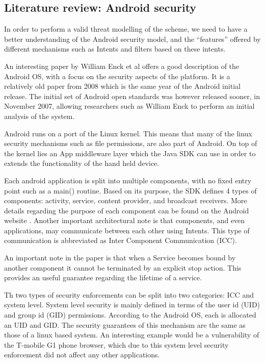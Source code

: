 \subsection{Literature review: Android security}
In order to perform a valid threat modelling of the scheme, we need to have a better understanding of the Android security model, and the ``features'' offered by different mechanisms such as Intents and filters based on these intents.

An interesting paper by William Enck et al \cite{} offers a good description of the Android OS, with a focus on the security aspects of the platform. It is a relatively old paper from 2008 which is the same year of the Android initial release. The initial set of Android open standards was however released sooner, in November 2007, allowing researchers such as William Enck to perform an initial analysis of the system.

Android runs on a port of the Linux kernel. This means that many of the linux security mechanisms such as file permissions, are also part of Android. On top of the kernel lies an App middleware layer which the Java SDK can use in order to extends the functionality of the hand held device.

Each android application is split into multiple components, with no fixed entry point such as a main() routine. Based on its purpose, the SDK defines 4 types of components: activity, service, content provider, and broadcast receivers. More details regarding the purpose of each component can be found on the Android website \cite{}. Another important architectural note is that components, and even applications, may communicate between each other using Intents. This type of communication is abbreviated as Inter Component Communication (ICC).

An important note in the paper is that when a Service becomes bound by another component it cannot be terminated by an explicit stop action. This provides an useful guarantee regarding the lifetime of a service. 

Th two types of security enforcements can be split into two categories: ICC and system level. System level security is mainly defined in terms of the user id (UID) and group id (GID) permissions. According to the Android OS, each is allocated an UID and GID. The security guarantees of this mechanism are the same as those of a linux based system. An interesting example would be a vulnerability of the  T-mobile G1 phone browser, which due to this system level security enforcement did not affect any other applications.


